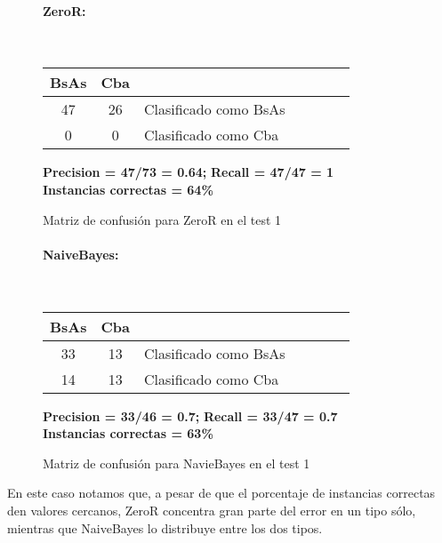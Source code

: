 \begin{figure}[H]
	\centering
	\paragraph*{ZeroR:}\mbox{}\\
	\begin{table}[H]
		\centering
		\begin{tabular}{|c|c|l|c|c|c|c|}
			\hline
			BsAs & Cba &  \\ \hline
			47 &  26 &  Clasificado como BsAs \\ \hline
			0 &  0 &  Clasificado como Cba \\ \hline
		\end{tabular}
	\end{table}
	\begin{center}
		\textbf{Precision = 47/73 = 0.64;} \textbf{Recall = 47/47 = 1}\\
		\textbf{Instancias correctas = 64\%}
	\end{center}
	\caption{Matriz de confusión para ZeroR en el test 1}
	\label{ZeroR_matrizconf_2}
\end{figure}

\begin{figure}[H]
	\centering
	\paragraph*{NaiveBayes:}\mbox{}\\
	\begin{table}[H]
		\centering
		\begin{tabular}{|c|c|l|c|c|c|c|}
			\hline
			BsAs & Cba &  \\ \hline
			33 &  13 &  Clasificado como BsAs \\ \hline
			14 &  13 &  Clasificado como Cba \\ \hline
		\end{tabular}
	\end{table}
	\begin{center}
		\textbf{Precision = 33/46 = 0.7;} \textbf{Recall = 33/47 = 0.7}\\
		\textbf{Instancias correctas = 63\%}
	\end{center}
	\caption{Matriz de confusión para NavieBayes en el test 1}
	\label{NaiveBayes_matrizconf_2}
\end{figure}

En este caso notamos que, a pesar de que el porcentaje de instancias correctas den valores cercanos, ZeroR concentra gran parte del error en un tipo sólo, mientras que NaiveBayes lo distribuye entre los dos tipos.

